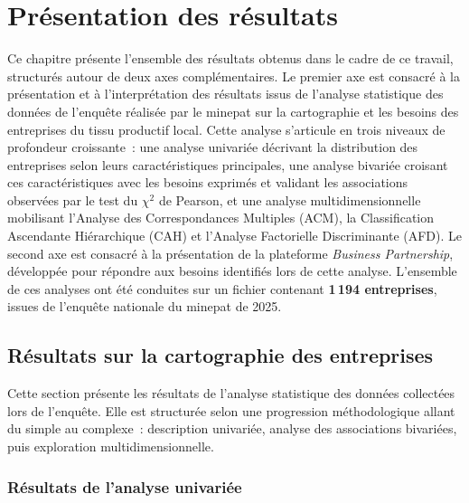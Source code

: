 \chapter{Présentation des résultats}

Ce chapitre présente l'ensemble des résultats obtenus dans le cadre
de ce travail, structurés autour de deux axes complémentaires. Le
premier axe est consacré à la présentation et à l'interprétation des
résultats issus de l'analyse statistique des données de l'enquête
réalisée par le \gls{minepat} sur la cartographie et les besoins des
entreprises du tissu productif local. Cette analyse s'articule en
trois niveaux de profondeur croissante~: une analyse univariée
décrivant la distribution des entreprises selon leurs caractéristiques
principales, une analyse bivariée croisant ces caractéristiques avec
les besoins exprimés et validant les associations observées par le
test du $\chi^2$ de Pearson, et une analyse multidimensionnelle
mobilisant l'Analyse des Correspondances Multiples (ACM), la
Classification Ascendante Hiérarchique (CAH) et l'Analyse Factorielle
Discriminante (AFD). Le second axe est consacré à la présentation de
la plateforme \textit{Business Partnership}, développée pour répondre
aux besoins identifiés lors de cette analyse. L'ensemble de ces
analyses ont été conduites sur un fichier contenant
\textbf{1\,194 entreprises}, issues de l'enquête nationale du
\gls{minepat} de 2025.

\section{Résultats sur la cartographie des entreprises}
\label{sec:resultats_carto}

Cette section présente les résultats de l'analyse statistique des
données collectées lors de l'enquête. Elle est structurée selon une
progression méthodologique allant du simple au complexe~: description
univariée, analyse des associations bivariées, puis exploration
multidimensionnelle.

\subsection{Résultats de l'analyse univariée}
\label{subsec:univariee}


